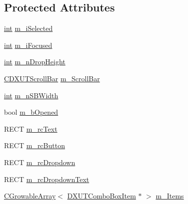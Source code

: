 \subsection*{Protected Attributes}
\begin{DoxyCompactItemize}
\item 
\hyperlink{_d_x_u_tgui_8cpp_a2d77ed03302b6978834ee3b6f57837fb}{int} \hyperlink{class_c_d_x_u_t_combo_box_a99b930287892598483a9f781d64fec12}{m\_\-iSelected}
\item 
\hyperlink{_d_x_u_tgui_8cpp_a2d77ed03302b6978834ee3b6f57837fb}{int} \hyperlink{class_c_d_x_u_t_combo_box_abd641180c69582003b5f40f49c9027b2}{m\_\-iFocused}
\item 
\hyperlink{_d_x_u_tgui_8cpp_a2d77ed03302b6978834ee3b6f57837fb}{int} \hyperlink{class_c_d_x_u_t_combo_box_a6d3b08d846a3173ecc7254ea52fae484}{m\_\-nDropHeight}
\item 
\hyperlink{class_c_d_x_u_t_scroll_bar}{CDXUTScrollBar} \hyperlink{class_c_d_x_u_t_combo_box_aa1f843f80e2acfe7fb7eff78f2814451}{m\_\-ScrollBar}
\item 
\hyperlink{_d_x_u_tgui_8cpp_a2d77ed03302b6978834ee3b6f57837fb}{int} \hyperlink{class_c_d_x_u_t_combo_box_a8a93260e93691d37486a6891a65122da}{m\_\-nSBWidth}
\item 
bool \hyperlink{class_c_d_x_u_t_combo_box_aa39eaf7eff000dd8dcfc8fac5eb8c8e6}{m\_\-bOpened}
\item 
RECT \hyperlink{class_c_d_x_u_t_combo_box_a39744f7d6e1e6aec8523b35223f45d9a}{m\_\-rcText}
\item 
RECT \hyperlink{class_c_d_x_u_t_combo_box_a9bd51f17fe1da9c55c4def1efce27f52}{m\_\-rcButton}
\item 
RECT \hyperlink{class_c_d_x_u_t_combo_box_a9dbf700ec2d33fb50397fb24e11a34a1}{m\_\-rcDropdown}
\item 
RECT \hyperlink{class_c_d_x_u_t_combo_box_a7e48109d7bcd08b41a2ebfa2b69a5b92}{m\_\-rcDropdownText}
\item 
\hyperlink{class_c_growable_array}{CGrowableArray}$<$ \hyperlink{struct_d_x_u_t_combo_box_item}{DXUTComboBoxItem} $\ast$ $>$ \hyperlink{class_c_d_x_u_t_combo_box_a40515ea29c58caaf49d309be5a6bb2fb}{m\_\-Items}
\end{DoxyCompactItemize}


